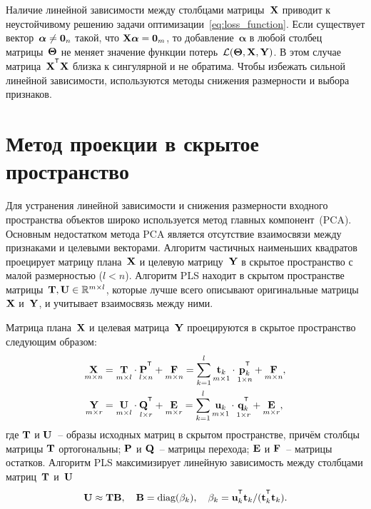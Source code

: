 Наличие линейной зависимости между столбцами матрицы~$\mathbf{X}$ приводит к неустойчивому решению задачи оптимизации~\eqref{eq:loss_function}.
Если существует вектор~$\boldsymbol{\alpha} \neq \boldsymbol{0}_n$ такой, что $\mathbf{X} \boldsymbol{\alpha}= \boldsymbol{0}_m$, то добавление~$\boldsymbol{\alpha}$ в любой столбец матрицы~$\boldsymbol{\Theta}$ не меняет значение функции потерь~$\mathcal{L}(\boldsymbol{\Theta}, \mathbf{X}, \mathbf{Y})$.
В этом случае матрица~$\bX^{\T} \bX$ близка к сингулярной и не обратима.
Чтобы избежать сильной линейной зависимости, используются методы снижения размерности и выбора признаков.

\section{Метод проекции в скрытое пространство}

Для устранения линейной зависимости и снижения размерности входного пространства объектов широко используется метод главных компонент~(PCA). 
Основным недостатком метода PCA является отсутствие взаимосвязи между признаками и целевыми векторами.
Алгоритм частичных наименьших квадратов проецирует матрицу плана~$\mathbf{X}$ и целевую матрицу~$\mathbf{Y}$ в скрытое пространство с малой размерностью ($l < n$).
Алгоритм PLS находит в скрытом пространстве матрицы~$\mathbf{T}, \mathbf{U} \in \mathbb{R}^{m \times l}$, которые лучше всего описывают оригинальные матрицы~$\mathbf{X}$ и~$\mathbf{Y}$, и учитывает взаимосвязь между ними.

Матрица плана~$\mathbf{X}$ и целевая матрица~$\mathbf{Y}$ проецируются в скрытое пространство следующим образом:
\begin{align}
\label{eq:PLS_X}
\underset{m \times n}{\bX} 
&= \underset{m \times l}{\bT} \cdot \underset{l \times n}{\bP^{\T}} + \underset{m \times n}{\bF} 
= \sum_{k=1}^l \underset{m \times 1}{\bt_k} \cdot \underset{1 \times n}{\bp_k^{\T}} + \underset{m \times n}{\bF},\\
\label{eq:PLS_Y}
\underset{m \times r}{\bY} 
&= \underset{m \times l}{\bU} \cdot \underset{l \times r}{\bQ^{\T}} + \underset{m \times r}{\bE}
=  \sum_{k=1}^l  \underset{m \times 1}{\bu_k} \cdot \underset{1 \times r}{\bq_k^{\T}} +  \underset{m \times r}{\bE},
\end{align}
где $\mathbf{T}$ и $\mathbf{U}$~-- образы исходных матриц в скрытом пространстве, причём столбцы матрицы $\mathbf{T}$ ортогональны; $\mathbf{P}$ и $\mathbf{Q}$~-- матрицы перехода; $\mathbf{E}$ и $\mathbf{F}$~-- матрицы остатков. Алгоритм PLS максимизирует линейную зависимость между столбцами матриц~$\mathbf{T}$ и~$\mathbf{U}$
\begin{equation*}
\bU \approx \bT \bB, \quad \bB = \text{diag}(\beta_k), \quad \beta_k = \bu_k^{\T}\bt_k / (\bt_k^{\T}\bt_k).
\end{equation*}



